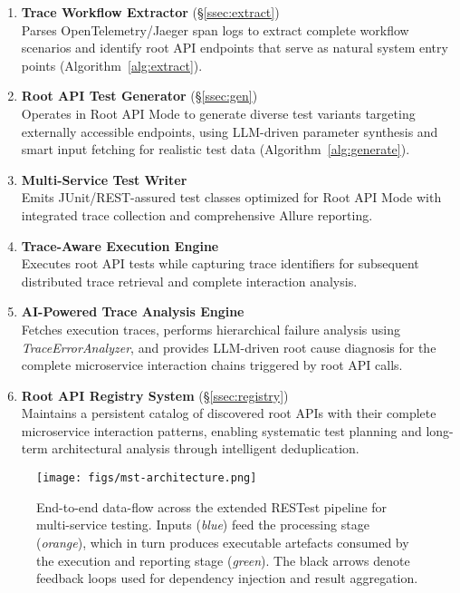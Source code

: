 \documentclass[conference]{IEEEtran}
\begin{document}
\begin{enumerate}[leftmargin=*]
  \item \textbf{Trace Workflow Extractor}  
        \hfill(\S\ref{ssec:extract})\\
        Parses OpenTelemetry/Jaeger span logs to extract complete workflow scenarios
        and identify root API endpoints that serve as natural system entry points (Algorithm~\ref{alg:extract}).
  \item \textbf{Root API Test Generator}  
        \hfill(\S\ref{ssec:gen})\\
        Operates in Root API Mode to generate diverse test variants targeting
        externally accessible endpoints, using LLM-driven parameter synthesis
        and smart input fetching for realistic test data (Algorithm~\ref{alg:generate}).
  \item \textbf{Multi-Service Test Writer}\\
        Emits JUnit/REST-assured test classes optimized for Root API Mode
        with integrated trace collection and comprehensive Allure reporting.
  \item \textbf{Trace-Aware Execution Engine}\\
        Executes root API tests while capturing trace identifiers for
        subsequent distributed trace retrieval and complete interaction analysis.
  \item \textbf{AI-Powered Trace Analysis Engine}\\
        Fetches execution traces, performs hierarchical failure analysis using
        \textit{TraceErrorAnalyzer}, and provides LLM-driven root cause diagnosis
        for the complete microservice interaction chains triggered by root API calls.
  \item \textbf{Root API Registry System}  
        \hfill(\S\ref{ssec:registry})\\
        Maintains a persistent catalog of discovered root APIs with their complete
        microservice interaction patterns, enabling systematic test planning and
        long-term architectural analysis through intelligent deduplication.
\end{enumerate}

\begin{figure}[t]
  \centering
  \texttt{[image: figs/mst-architecture.png]}
  \caption{End-to-end data-flow across the extended RESTest pipeline for
           multi-service testing.  Inputs (\textit{blue}) feed the processing
           stage (\textit{orange}), which in turn produces executable artefacts
           consumed by the execution and reporting stage (\textit{green}).  The
           black arrows denote feedback loops used for dependency injection
           and result aggregation.}
  \label{fig:dataflow}
\end{figure}
\end{document}
